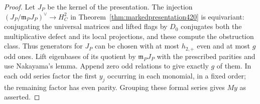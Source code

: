 \documentclass[a4paper,11pt]{article}
\theoremstyle{definition}
\theoremstyle{remark}
\numberwithin{equation}{section}
\begin{document}
\begin{proof}
Let \(J_P\) be the kernel of the presentation. The injection
\((J_P/\mathfrak m_P J_P)^\vee\to H_C^2\) in
Theorem~\ref{thm:markedpresentation420} is equivariant:
conjugating the universal matrices and lifted flags by
\(D_0\) conjugates both the multiplicative defect and its
local projections, and these compute the obstruction class.
Thus generators for \(J_P\) can be chosen with at most
\(h_{2,+}\) even and at most \(g\) odd ones. Lift eigenbases
of its quotient by \(\mathfrak m_P J_P\) with the prescribed
parities and use Nakayama's lemma. Append zero odd relations
to give exactly \(g\) of them. In each odd series factor the
first \(y_j\) occurring in each monomial, in a fixed order;
the remaining factor has even parity. Grouping these formal
series gives \(My\) as asserted.
\end{proof}
\end{document}
